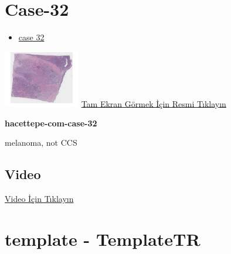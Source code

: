 \documentclass[
  letterpaper,
  DIV=11,
  numbers=noendperiod]{scrreprt}
\providecommand{\tightlist}{%
  \setlength{\itemsep}{0pt}\setlength{\parskip}{0pt}}\usepackage{longtable,booktabs,array}
\begin{document}
\hypertarget{sec-hacettepe-case-of-the-month-case-32}{%
\section{Case-32}\label{sec-hacettepe-case-of-the-month-case-32}}

\begin{itemize}
\tightlist
\item
  \href{https://www.youtube.com/watch?v=mnLIi1sNnlQ&ab_channel=KemalKosemehmetoglu}{case
  32}
\end{itemize}

\href{https://images.patolojiatlasi.com/hacettepe-com-case-32/HE.html}{\includegraphics[width=0.25\textwidth,height=\textheight]{./screenshots/thumbnail_hacettepe-com-case-32.png}}
\href{https://images.patolojiatlasi.com/hacettepe-com-case-32/HE.html}{Tam
Ekran Görmek İçin Resmi Tıklayın}

\textbf{hacettepe-com-case-32}

\begin{tcolorbox}[enhanced jigsaw, breakable, opacitybacktitle=0.6, arc=.35mm, colbacktitle=quarto-callout-tip-color!10!white, colback=white, toptitle=1mm, left=2mm, opacityback=0, colframe=quarto-callout-tip-color-frame, titlerule=0mm, rightrule=.15mm, bottomrule=.15mm, toprule=.15mm, bottomtitle=1mm, title=\textcolor{quarto-callout-tip-color}{\faLightbulb}\hspace{0.5em}{Tanı}, coltitle=black, leftrule=.75mm]

melanoma, not CCS

\end{tcolorbox}

\hypertarget{video-31}{%
\subsection{Video}\label{video-31}}

\href{https://www.youtube.com/watch?v=mnLIi1sNnlQ}{Video İçin Tıklayın}

\hypertarget{sec-template}{%
\section{template - TemplateTR}\label{sec-template}}
\end{document}
